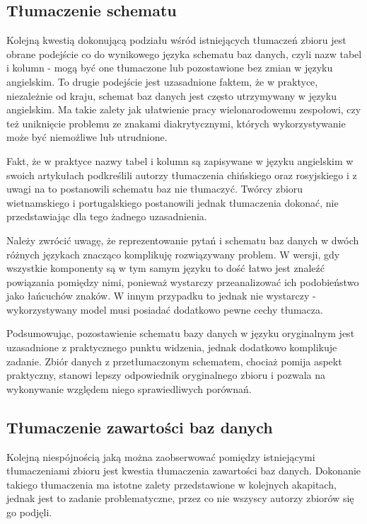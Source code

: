 \subsection{Tłumaczenie schematu}
Kolejną kwestią dokonującą podziału wśród istniejących tłumaczeń zbioru  jest obrane podejście co do wynikowego języka schematu baz danych, czyli nazw tabel i kolumn - mogą być one tłumaczone lub pozostawione bez zmian w języku angielskim. To drugie podejście jest uzasadnione faktem, że w praktyce, niezależnie od kraju, schemat baz danych jest często utrzymywany w języku angielskim. Ma takie zalety jak ułatwienie pracy wielonarodowemu zespołowi, czy też uniknięcie problemu ze znakami diakrytycznymi, których wykorzystywanie może być niemożliwe lub utrudnione.

Fakt, że w praktyce nazwy tabel i kolumn są zapisywane w języku angielskim w swoich artykułach podkreślili autorzy tłumaczenia chińskiego oraz rosyjskiego i z uwagi na to postanowili schematu baz nie tłumaczyć. Twórcy zbioru wietnamskiego i portugalskiego postanowili jednak tłumaczenia dokonać, nie przedstawiając dla tego żadnego uzasadnienia.

Należy zwrócić uwagę, że reprezentowanie pytań i schematu baz danych w dwóch różnych językach znacząco komplikuję rozwiązywany problem. W wersji, gdy wszystkie komponenty są w tym samym języku to dość łatwo jest znaleźć powiązania pomiędzy nimi, ponieważ wystarczy przeanalizować ich podobieństwo jako łańcuchów znaków. W innym przypadku to jednak nie wystarczy - wykorzystywany model musi posiadać dodatkowo pewne cechy tłumacza.

Podsumowując, pozostawienie schematu bazy danych w języku oryginalnym jest uzasadnione z praktycznego punktu widzenia, jednak dodatkowo komplikuje zadanie. Zbiór danych z przetłumaczonym schematem, chociaż pomija aspekt praktyczny, stanowi lepszy odpowiednik oryginalnego zbioru  i pozwala na wykonywanie względem niego sprawiedliwych porównań.

\subsection{Tłumaczenie zawartości baz danych}
Kolejną niespójnością jaką można zaobserwować pomiędzy istniejącymi tłumaczeniami zbioru  jest kwestia tłumaczenia zawartości baz danych. Dokonanie takiego tłumaczenia ma istotne zalety przedstawione w kolejnych akapitach, jednak jest to zadanie problematyczne, przez co nie wszyscy autorzy zbiorów się go podjęli.

